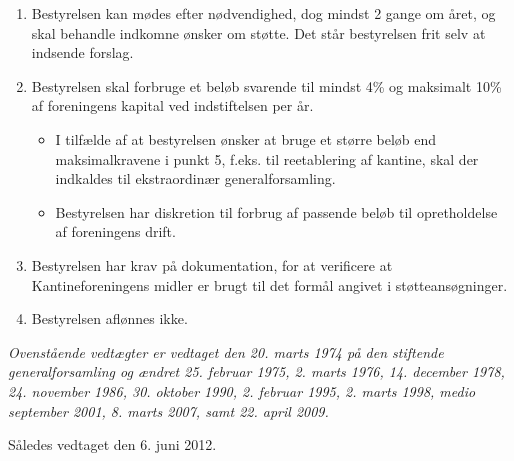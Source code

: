 \documentclass[a4paper, 10pt]{article}
\def\vedtagsdato{den 6. juni 2012}
\begin{document}
\begin{enumerate}
\item Bestyrelsen kan mødes efter nødvendighed, dog mindst 2 gange om
året, og skal behandle indkomne ønsker om støtte. Det står bestyrelsen
frit selv at indsende forslag.

\item Bestyrelsen skal forbruge et beløb svarende til mindst 4\% og
maksimalt 10\% af foreningens kapital ved indstiftelsen per år.

\begin{itemize}

\item I tilfælde af at bestyrelsen ønsker at bruge et større beløb end
maksimalkravene i punkt 5, f.eks. til reetablering af kantine, skal
der indkaldes til ekstraordinær generalforsamling.

\item Bestyrelsen har diskretion til forbrug af passende beløb til
opret\-holdelse af foreningens drift.

\end{itemize}

\item Bestyrelsen har krav på dokumentation, for at verificere at
Kantinefor\-eningens midler er brugt til det formål angivet i
støtteansøgninger.

\item Bestyrelsen aflønnes ikke.

\end{enumerate}

\vspace{\fill}

\noindent \emph{Ovenstående vedtægter er vedtaget den 20. marts 1974
på den stiftende generalforsamling og ændret 25.  februar 1975, 2.
marts 1976, 14. december 1978, 24. november 1986, 30.  oktober 1990,
2.  februar 1995, 2. marts 1998, medio september 2001, 8. marts 2007,
samt 22. april 2009.}

\bigskip

\noindent Således vedtaget \vedtagsdato{}.
\end{document}
